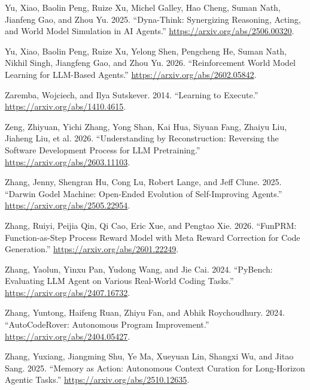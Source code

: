 \documentclass{article}
\newlength{\cslhangindent}
\newenvironment{CSLReferences}[2]
 {%
  \setlength{\parindent}{0pt}
  \everypar{\setlength{\hangindent}{\cslhangindent}}\ignorespaces
 }
 {\par}
\begin{document}
\begin{CSLReferences}{1}{0}
\leavevmode{}%
Yu, Xiao, Baolin Peng, Ruize Xu, Michel Galley, Hao Cheng, Suman Nath,
Jianfeng Gao, and Zhou Yu. 2025. {``Dyna-Think: Synergizing Reasoning,
Acting, and World Model Simulation in AI Agents.''}
\url{https://arxiv.org/abs/2506.00320}.

\leavevmode{}%
Yu, Xiao, Baolin Peng, Ruize Xu, Yelong Shen, Pengcheng He, Suman Nath,
Nikhil Singh, Jiangfeng Gao, and Zhou Yu. 2026. {``Reinforcement World
Model Learning for LLM-Based Agents.''}
\url{https://arxiv.org/abs/2602.05842}.

\leavevmode{}%
Zaremba, Wojciech, and Ilya Sutskever. 2014. {``Learning to Execute.''}
\url{https://arxiv.org/abs/1410.4615}.

\leavevmode{}%
Zeng, Zhiyuan, Yichi Zhang, Yong Shan, Kai Hua, Siyuan Fang, Zhaiyu Liu,
Jiaheng Liu, et al. 2026. {``Understanding by Reconstruction: Reversing
the Software Development Process for LLM Pretraining.''}
\url{https://arxiv.org/abs/2603.11103}.

\leavevmode{}%
Zhang, Jenny, Shengran Hu, Cong Lu, Robert Lange, and Jeff Clune. 2025.
{``Darwin Godel Machine: Open-Ended Evolution of Self-Improving
Agents.''} \url{https://arxiv.org/abs/2505.22954}.

\leavevmode{}%
Zhang, Ruiyi, Peijia Qin, Qi Cao, Eric Xue, and Pengtao Xie. 2026.
{``FunPRM: Function-as-Step Process Reward Model with Meta Reward
Correction for Code Generation.''}
\url{https://arxiv.org/abs/2601.22249}.

\leavevmode{}%
Zhang, Yaolun, Yinxu Pan, Yudong Wang, and Jie Cai. 2024. {``PyBench:
Evaluating LLM Agent on Various Real-World Coding Tasks.''}
\url{https://arxiv.org/abs/2407.16732}.

\leavevmode{}%
Zhang, Yuntong, Haifeng Ruan, Zhiyu Fan, and Abhik Roychoudhury. 2024.
{``AutoCodeRover: Autonomous Program Improvement.''}
\url{https://arxiv.org/abs/2404.05427}.

\leavevmode{}%
Zhang, Yuxiang, Jiangming Shu, Ye Ma, Xueyuan Lin, Shangxi Wu, and Jitao
Sang. 2025. {``Memory as Action: Autonomous Context Curation for
Long-Horizon Agentic Tasks.''} \url{https://arxiv.org/abs/2510.12635}.


\end{CSLReferences}
\end{document}
